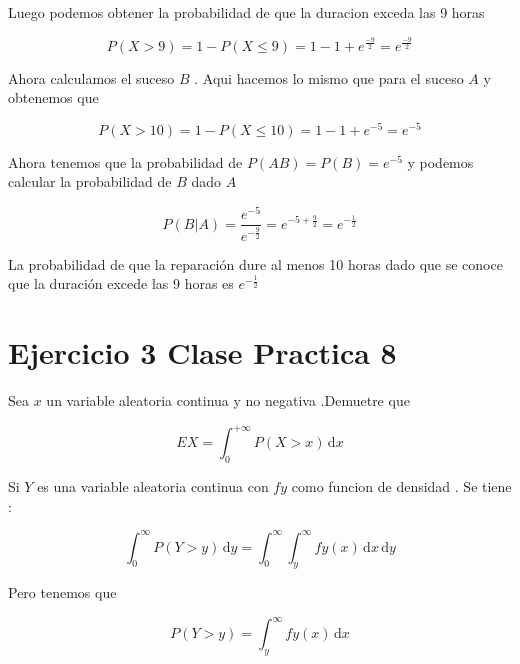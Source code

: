 \documentclass{article}
\begin{document}
    Luego podemos obtener la probabilidad de que la duracion exceda las 9 horas 
    
    \begin{equation*}
        P \left(X > 9 \right) = 1 -  P \left(X \le 9 \right)  = 1 - 1 + e^{\frac{-9}{2}} = e^{\frac{-9}{2}}
    \end{equation*}

    Ahora calculamos el suceso $B$ . Aqui hacemos lo mismo que para el suceso $A$ y obtenemos que 

    \begin{equation*}
        P \left(X > 10 \right) = 1 -  P \left(X \le 10 \right)  = 1 - 1 + e^{-5} = e^{-5}
    \end{equation*}

    Ahora tenemos que la probabilidad de $P \left(AB\right) = P \left(B\right) = e^{-5}$
    y podemos calcular la probabilidad de $B$ dado $A$ 

    \begin{equation*}
        P \left(B|A\right) = \frac{e^{-5}}{e^{-\frac{9}{2}}} = e^{-5 + \frac{9}{2}}  = e^{-\frac{1}{2}}
    \end{equation*}

    La probabilidad de que la reparaci\'on dure al menos 10 horas dado que se conoce
    que la duraci\'on excede las 9 horas es $e^{-\frac{1}{2}}$

    \section*{Ejercicio 3 Clase Practica 8}

    Sea  $x$ un variable aleatoria continua y no negativa .Demuetre que 

    \begin{equation*}
        EX = \int_{0}^{+ \infty} P \left(X > x \right)  \,\mathrm{d}x 
    \end{equation*}

    Si $Y$ es una variable aleatoria continua con $fy$ como funcion de densidad .
    Se tiene : 

    \begin{equation*}
        \int_{0}^{\infty} P \left(Y > y\right)  \,\mathrm{d}y =  
        \int_{0}^{\infty} \int_{y}^{\infty}  fy \left(x\right)\,\mathrm{d}x  \,\mathrm{d}y
    \end{equation*}

    Pero tenemos que  

    \begin{equation*}
        P \left(Y > y \right) = 
        \int_{y}^{\infty} fy \left(x\right) \,\mathrm{d}x 
    \end{equation*}
\end{document}
